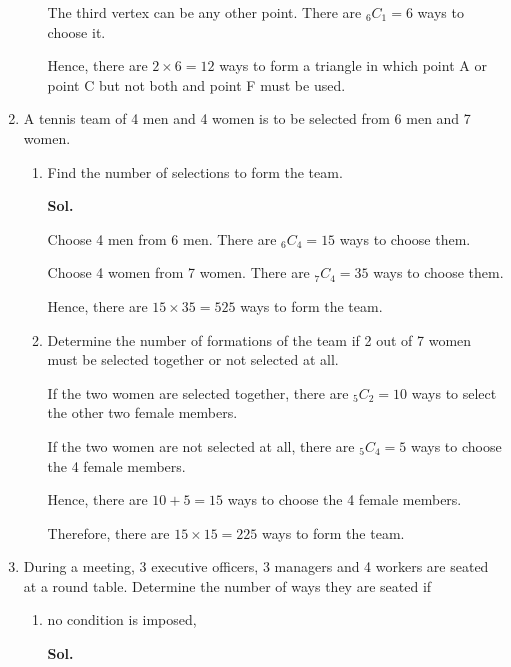 \documentclass{report}
\newcommand\comb[2][^n]{{}_{#1}C_{#2}}
\newcommand{\sol}[1]{

      \noindent \textbf{Sol.}
}
\def\eos{\quad\hbox{\rlap{\hbox{\vrule depth 1.5pt height 2.6mm width 0.2mm \hskip 1mm \vrule height 2.6mm width 0.2mm}}{\vbox{\hrule height 0.2mm width 1.4mm \vskip 2.8mm \hrule depth 1.5pt height -0.35mm width 1.2mm}}}}
\begin{document}
\begin{multicols*}{2}
\begin{enumerate}
\begin{enumerate}
                              The third vertex can be any other point. There are $\comb[6]{1} = 6$ ways to
                              choose it.

                              Hence, there are $2 \times 6 = 12$ ways to form a triangle in which point A or
                              point C but not both and point F must be used. $\eos$
                  \end{enumerate}

            \item A tennis team of 4 men and 4 women is to be selected from 6 men and 7 women.
                  \begin{enumerate}
                        \item Find the number of selections to form the team. \sol{}

                              Choose 4 men from 6 men. There are $\comb[6]{4} = 15$ ways to choose them.

                              Choose 4 women from 7 women. There are $\comb[7]{4} = 35$ ways to choose them.

                              Hence, there are $15 \times 35 = 525$ ways to form the team. $\eos$

                        \item Determine the number of formations of the team if 2 out of 7 women must be
                              selected together or not selected at all.

                              If the two women are selected together, there are $\comb[5]{2} = 10$ ways to
                              select the other two female members.

                              If the two women are not selected at all, there are $\comb[5]{4} = 5$ ways to
                              choose the 4 female members.

                              Hence, there are $10 + 5 = 15$ ways to choose the 4 female members.

                              Therefore, there are $15 \times 15 = 225$ ways to form the team. $\eos$
                  \end{enumerate}

            \item During a meeting, 3 executive officers, 3 managers and 4 workers are seated at
                  a round table. Determine the number of ways they are seated if
                  \begin{enumerate}
                        \item no condition is imposed, \sol{}


\end{enumerate}
\end{enumerate}
\end{multicols*}
\end{document}
